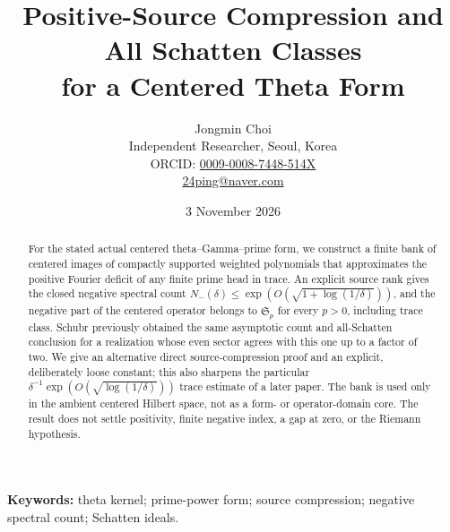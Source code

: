 \documentclass[11pt]{article}
\title{Positive-Source Compression and All Schatten Classes\\for a Centered Theta Form}
\author{Jongmin Choi\\\small Independent Researcher, Seoul, Korea\\\small ORCID: \href{https://orcid.org/0009-0008-7448-514X}{0009-0008-7448-514X}\\\small \href{mailto:24ping@naver.com}{24ping@naver.com}}
\date{3 November 2026}
\begin{document}
\maketitle
\begin{abstract}
For the stated actual centered theta--Gamma--prime form, we construct a finite bank of centered images of compactly supported weighted polynomials that approximates the positive Fourier deficit of any finite prime head in trace. An explicit source rank gives the closed negative spectral count $N_-(\delta)\le\exp(O(\sqrt{1+\log(1/\delta)}))$, and the negative part of the centered operator belongs to $\mathfrak S_p$ for every $p>0$, including trace class. Schubr previously obtained the same asymptotic count and all-Schatten conclusion for a realization whose even sector agrees with this one up to a factor of two. We give an alternative direct source-compression proof and an explicit, deliberately loose constant; this also sharpens the particular $\delta^{-1}\exp(O(\sqrt{\log(1/\delta)}))$ trace estimate of a later paper. The bank is used only in the ambient centered Hilbert space, not as a form- or operator-domain core. The result does not settle positivity, finite negative index, a gap at zero, or the Riemann hypothesis.
\end{abstract}
\noindent\textbf{Keywords:} theta kernel; prime-power form; source compression; negative spectral count; Schatten ideals.
\end{document}
